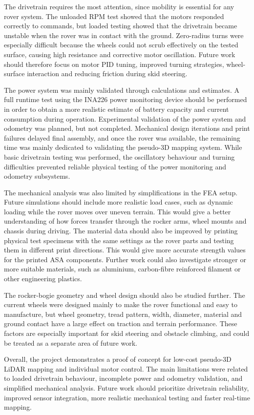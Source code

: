 The drivetrain requires the most attention, since mobility is essential for any rover system. The unloaded RPM test showed that the motors responded correctly to commands, but loaded testing showed that the drivetrain became unstable when the rover was in contact with the ground. Zero-radius turns were especially difficult because the wheels could not scrub effectively on the tested surface, causing high resistance and corrective motor oscillation. Future work should therefore focus on motor PID tuning, improved turning strategies, wheel-surface interaction and reducing friction during skid steering.

The power system was mainly validated through calculations and estimates. A full runtime test using the INA226 power monitoring device should be performed in order to obtain a more realistic estimate of battery capacity and current consumption during operation. Experimental validation of the power system and odometry was planned, but not completed. Mechanical design iterations and print failures delayed final assembly, and once the rover was available, the remaining time was mainly dedicated to validating the pseudo-3D mapping system. While basic drivetrain testing was performed, the oscillatory behaviour and turning difficulties prevented reliable physical testing of the power monitoring and odometry subsystems.

The mechanical analysis was also limited by simplifications in the FEA setup. Future simulations should include more realistic load cases, such as dynamic loading while the rover moves over uneven terrain. This would give a better understanding of how forces transfer through the rocker arms, wheel mounts and chassis during driving. The material data should also be improved by printing physical test specimens with the same settings as the rover parts and testing them in different print directions. This would give more accurate strength values for the printed ASA components. Further work could also investigate stronger or more suitable materials, such as aluminium, carbon-fibre reinforced filament or other engineering plastics.

The rocker-bogie geometry and wheel design should also be studied further. The current wheels were designed mainly to make the rover functional and easy to manufacture, but wheel geometry, tread pattern, width, diameter, material and ground contact have a large effect on traction and terrain performance. These factors are especially important for skid steering and obstacle climbing, and could be treated as a separate area of future work.

Overall, the project demonstrates a proof of concept for low-cost pseudo-3D LiDAR mapping and individual motor control. The main limitations were related to loaded drivetrain behaviour, incomplete power and odometry validation, and simplified mechanical analysis. Future work should prioritize drivetrain reliability, improved sensor integration, more realistic mechanical testing and faster real-time mapping.